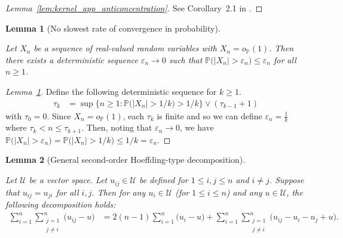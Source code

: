\documentclass[11pt,lof]{puthesis}
\renewcommand{\P}{\ensuremath{\mathbb{P}}}
\newcommand{\cU}{\ensuremath{\mathcal{U}}}
\theoremstyle{break}
\newtheorem{lemma}{Lemma}[section]
\theoremstyle{proof}
\newtheorem{proof}{Proof}
\begin{document}
\begin{proof}[Lemma~\ref{lem:kernel_app_anticoncentration}]

See Corollary~2.1
in \citet{chernozhukov2014anti}.
\end{proof}

\begin{lemma}[No slowest rate of convergence in probability]
\label{lem:kernel_app_slow_convergence}

Let $X_n$ be a sequence of real-valued random
variables with
$X_n = o_\P(1)$.
Then there exists a deterministic sequence
$\varepsilon_n \to 0$
such that
$\P\big(|X_n| > \varepsilon_n\big) \leq \varepsilon_n$
for all $n \geq 1$.

\end{lemma}

\begin{proof}[Lemma~\ref{lem:kernel_app_slow_convergence}]

Define the following deterministic sequence
for $k \geq 1$.
%
\begin{align*}
\tau_k
&=
\sup
\big\{
n \geq 1:
\P\big(|X_n| > 1/k\big)
> 1/k
\big\}
\vee
(\tau_{k-1} +1)
\end{align*}
%
with $\tau_0 = 0$.
Since $X_n = o_\P(1)$,
each $\tau_k$ is finite
and so we can define
$\varepsilon_n = \frac{1}{k}$
where $\tau_k < n \leq \tau_{k+1}$.
Then, noting that $\varepsilon_n \to 0$,
we have
$\P\big(|X_n| > \varepsilon_n\big)
= \P\big(|X_n| > 1/k\big) \leq 1/k = \varepsilon_n$.
\end{proof}

\begin{lemma}[General second-order Hoeffding-type decomposition]
\label{lem:kernel_app_general_hoeffding}

Let $\cU$ be a vector space.
Let $u_{i j} \in \cU$ be defined for
$1 \leq i, j \leq n$
and
$i \neq j$.
Suppose that $u_{i j} = u_{j i}$
for all $i,j$.
Then for any $u_i \in \cU$
(for $1 \leq i \leq n$)
and any $u \in \cU$,
the following decomposition holds:
%
\begin{align*}
\sum_{i=1}^n
\sum_{\substack{j=1 \\ j \neq i}}^n
\big(u_{i j} - u\big)
&=
2(n-1)
\sum_{i=1}^n
\big(u_i - u\big)
+
\sum_{i=1}^n
\sum_{\substack{j=1 \\ j \neq i}}^n
\big(u_{i j} - u_i - u_j + u\big).
\end{align*}

\end{lemma}
\end{document}
